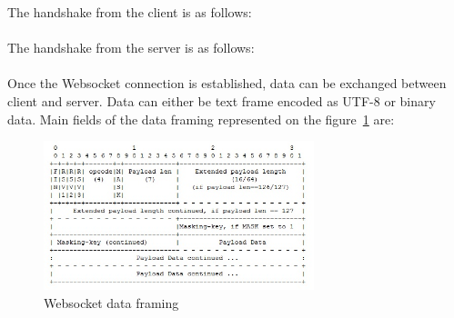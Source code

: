 \documentclass[pdftex,10pt,a4paper]{report}
\begin{document}
The handshake from the client is as follows: \\

\\


The handshake from the server is as follows: \\

 \\


Once the Websocket connection is established, data can be exchanged between client and server. Data can either be text frame encoded as UTF-8 or binary data. Main fields of the data framing represented on the figure~\ref{Websocket data framing} are:

\begin{figure}[h!]
		\centering
		\includegraphics[width=0.7\textwidth]{./frame_ws.jpg}
		\caption{Websocket data framing}
		\label{Websocket data framing}
\end{figure}
\end{document}
